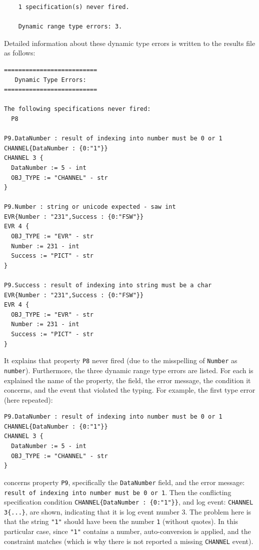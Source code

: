 \documentclass{report}
\begin{document}
\begin{verbatim}
    1 specification(s) never fired.

    Dynamic range type errors: 3.
\end{verbatim}

\noindent
Detailed information about these dynamic type errors is written to the results file as follows:

\begin{verbatim}
==========================
   Dynamic Type Errors:
==========================

The following specifications never fired:
  P8

P9.DataNumber : result of indexing into number must be 0 or 1 
CHANNEL{DataNumber : {0:"1"}}
CHANNEL 3 {
  DataNumber := 5 - int
  OBJ_TYPE := "CHANNEL" - str
}

P9.Number : string or unicode expected - saw int 
EVR{Number : "231",Success : {0:"FSW"}}
EVR 4 {
  OBJ_TYPE := "EVR" - str
  Number := 231 - int
  Success := "PICT" - str
}

P9.Success : result of indexing into string must be a char 
EVR{Number : "231",Success : {0:"FSW"}}
EVR 4 {
  OBJ_TYPE := "EVR" - str
  Number := 231 - int
  Success := "PICT" - str
}
\end{verbatim}

\noindent
It explains that property {\tt P8} never fired (due to the misspelling of {\tt Number} as {\tt number}).
Furthermore, the three dynamic range type errors are listed. For each is explained the name of the property,
the field, the error message, the condition it concerns, and the event that violated the
typing. For example, the first type error (here repeated):

\begin{verbatim}
P9.DataNumber : result of indexing into number must be 0 or 1 
CHANNEL{DataNumber : {0:"1"}}
CHANNEL 3 {
  DataNumber := 5 - int
  OBJ_TYPE := "CHANNEL" - str
}
\end{verbatim}

\noindent
concerns property {\tt P9}, specifically the {\tt DataNumber} field,
and the error message: {\tt result of indexing into number must be 0 or 1}.
Then the conflicting specification condition \verb+CHANNEL{DataNumber : {0:"1"}}+,
and log event: \verb+CHANNEL 3{...}+, are shown, indicating that it is log event number 3.
The problem here is that the string \verb+"1"+ should have been the number \verb+1+ (without quotes).
In this particular case, since \verb+"1"+ contains a number, auto-conversion is applied, and the constraint
matches (which is why there is not reported a missing \verb+CHANNEL+ event).
\end{document}
